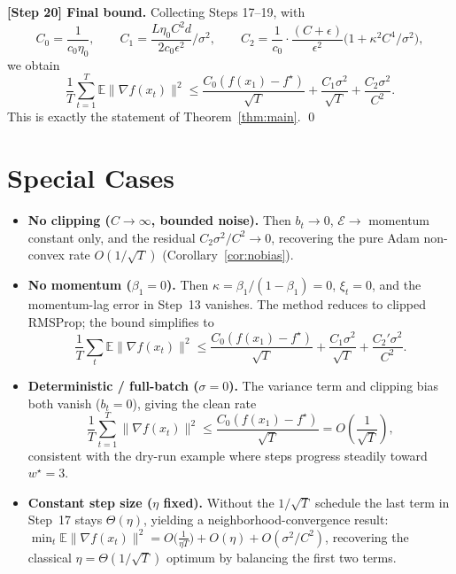 \documentclass[11pt]{article}
\begin{document}
\textbf{[Step 20] Final bound.}
Collecting Steps 17--19, with
\[
C_0 = \frac{1}{c_0\eta_0},\qquad
C_1 = \frac{L\eta_0 C^2 d}{2c_0\epsilon^2}\Big/\sigma^2,\qquad
C_2 = \frac{1}{c_0}\cdot\frac{(C+\epsilon)}{\epsilon^2}\big(1+\kappa^2 C^4/\sigma^2\big),
\]
we obtain
\[
\boxed{\;
\frac{1}{T}\sum_{t=1}^{T}\mathbb{E}\|\nabla f(x_t)\|^2
\le \frac{C_0(f(x_1)-f^\star)}{\sqrt T}
+ \frac{C_1\sigma^2}{\sqrt T}
+ \frac{C_2\sigma^2}{C^2}.
\;}
\]
This is exactly the statement of Theorem~\ref{thm:main}. \qed

\section*{Special Cases}

\begin{itemize}
\item \textbf{No clipping ($C\to\infty$, bounded noise).}
Then $b_t\to0$, $\mathcal E\to$ momentum constant only, and the residual
$C_2\sigma^2/C^2\to0$, recovering the pure Adam non-convex rate
$O(1/\sqrt T)$ (Corollary~\ref{cor:nobias}).

\item \textbf{No momentum ($\beta_1=0$).}
Then $\kappa=\beta_1/(1-\beta_1)=0$, $\xi_t=0$, and the momentum-lag error in Step~13
vanishes. The method reduces to clipped RMSProp; the bound simplifies to
\[
\frac{1}{T}\sum_t \mathbb{E}\|\nabla f(x_t)\|^2
\le \frac{C_0(f(x_1)-f^\star)}{\sqrt T} + \frac{C_1\sigma^2}{\sqrt T}
+ \frac{C_2'\sigma^2}{C^2}.
\]

\item \textbf{Deterministic / full-batch ($\sigma=0$).}
The variance term and clipping bias both vanish ($b_t=0$), giving the clean rate
\[
\frac{1}{T}\sum_{t=1}^T \|\nabla f(x_t)\|^2 \le \frac{C_0(f(x_1)-f^\star)}{\sqrt T} = O\!\left(\frac{1}{\sqrt T}\right),
\]
consistent with the dry-run example where steps progress steadily toward $w^\star=3$.

\item \textbf{Constant step size ($\eta$ fixed).}
Without the $1/\sqrt T$ schedule the last term in Step~17 stays $\Theta(\eta)$, yielding a
neighborhood-convergence result:
$\min_t\mathbb{E}\|\nabla f(x_t)\|^2 = O\big(\tfrac{1}{\eta T}\big) + O(\eta) + O(\sigma^2/C^2)$,
recovering the classical $\eta = \Theta(1/\sqrt T)$ optimum by balancing the first two terms.
\end{itemize}
\end{document}
